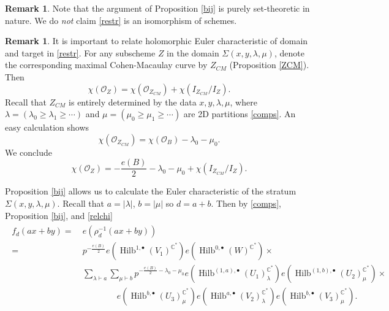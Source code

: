 \documentclass{amsart}
\theoremstyle{definition}
\newtheorem{remark}[theorem]{Remark}
\newcommand{\CC} {\mathbb{C}}          %
\renewcommand{\O}{\mathcal{O}}
\newcommand{\Hilb}{\operatorname{Hilb}}
\begin{document}
\begin{remark}
Note that the argument of Proposition \ref{bij} is purely set-theoretic in nature. We do \emph{not} claim \eqref{restr} is an isomorphism of schemes. 
\end{remark}

\begin{remark}
It is important to relate holomorphic Euler characteristic of domain and target in \eqref{restr}. For any subscheme $Z$ in the domain $\Sigma(x,y,\lambda,\mu)$, denote the corresponding maximal Cohen-Macaulay curve by $Z_{CM}$ (Proposition \ref{ZCM}). Then
$$
\chi(\O_Z) = \chi(\O_{Z_{CM}}) + \chi(I_{Z_{CM}} / I_{Z}).
$$ 
Recall that $Z_{CM}$ is entirely determined by the data $x,y, \lambda, \mu$, where $\lambda = (\lambda_0 \geq \lambda_1 \geq \cdots)$ and $\mu = (\mu_0 \geq \mu_1 \geq \cdots)$ are 2D partitions \eqref{comps}. An easy calculation shows 
$$
\chi(\O_{Z_{CM}}) = \chi(\O_B) - \lambda_0 - \mu_0.
$$
We conclude
\begin{equation} \label{relchi}
\chi(\O_Z) = -\frac{e(B)}{2} - \lambda_0 - \mu_0 + \chi(I_{Z_{CM}} / I_{Z}).
\end{equation}
\end{remark}

Proposition \ref{bij} allows us to calculate the Euler characteristic of the stratum $\Sigma(x,y,\lambda,\mu)$. Recall that $a = |\lambda|$, $b=|\mu|$ so $d=a+b$. Then by \eqref{comps}, Proposition \ref{bij}, and \eqref{relchi}
\begin{align}
\begin{split} \label{fdintermediate}
f_d(ax+by) = \ &e(\rho_{d}^{-1}(ax+by)) \\
= \ &p^{-\frac{e(B)}{2}} e(\Hilb^{1,\bullet}(V_1)^{\CC^*}) e(\Hilb^{0,\bullet}(W)^{\CC^*}) \times \\
&\sum_{\lambda \vdash a} \sum_{\mu \vdash b} p^{-\frac{e(B)}{2} - \lambda_0 - \mu_0 } e(\Hilb^{(1,a),\bullet}(U_1)_{\lambda}^{\CC^*}) e(\Hilb^{(1,b),\bullet}(U_2)_{\mu}^{\CC^*}) \times \\
&\qquad\qquad e(\Hilb^{b,\bullet}(U_3)_{\mu}^{\CC^*}) e(\Hilb^{a,\bullet}(V_2)_{\lambda}^{\CC^*}) e(\Hilb^{b,\bullet}(V_3)_{\mu}^{\CC^*}).
\end{split}
\end{align}
\end{document}
